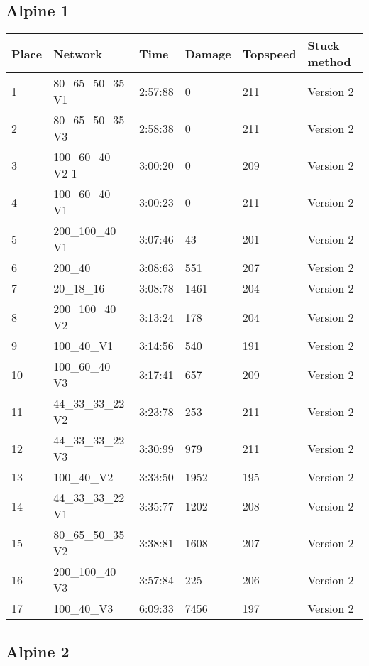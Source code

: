 \documentclass[a4paper,10pt]{scrartcl}
\begin{document}
\subsection*{Alpine 1}
\begin{table}[H]
\begin{tabular}{llllll}
 \textbf{Place} & \textbf{Network} & \textbf{Time} & \textbf{Damage} & \textbf{Topspeed}  & \textbf{Stuck method} \\ \hline
 1&  80\_65\_50\_35 V1  & 2:57:88 & 0 & 211 & Version 2 \\
 2&  80\_65\_50\_35 V3 & 2:58:38 & 0 & 211 & Version 2 \\
 3& 100\_60\_40 V2 1 & 3:00:20 & 0 & 209 & Version 2	\\
 4&  100\_60\_40 V1 & 3:00:23 & 0 & 211 & Version 2 \\  
 5 & 200\_100\_40 V1  & 3:07:46 & 43 & 201 & Version 2 \\
 6&  200\_40 & 3:08:63 & 551 & 207 & Version 2    \\
 7&  20\_18\_16  & 3:08:78  & 1461 & 204 & Version 2    \\
 8&  200\_100\_40 V2  & 3:13:24 & 178 & 204 & Version 2 \\
 9&   100\_40\_V1  & 3:14:56 & 540 & 191 & Version 2 \\
 10&  100\_60\_40 V3  & 3:17:41  & 657 & 209 & Version 2   \\ 
 11&  44\_33\_33\_22 V2  & 3:23:78 & 253 & 211 & Version 2 \\
 12&  44\_33\_33\_22 V3 & 3:30:99 & 979 & 211 & Version 2 \\
 13&   100\_40\_V2 & 3:33:50 & 1952 & 195 & Version 2 \\
 14&   44\_33\_33\_22 V1 & 3:35:77 & 1202 & 208 & Version 2 \\
 15&  80\_65\_50\_35 V2 & 3:38:81 & 1608 & 207 & Version 2 \\
 16&  200\_100\_40 V3  & 3:57:84 & 225 & 206 & Version 2 \\
 17&   100\_40\_V3  & 6:09:33 & 7456 & 197 & Version 2 \\
\end{tabular}
\end{table}

\subsection*{Alpine 2}
\end{document}
